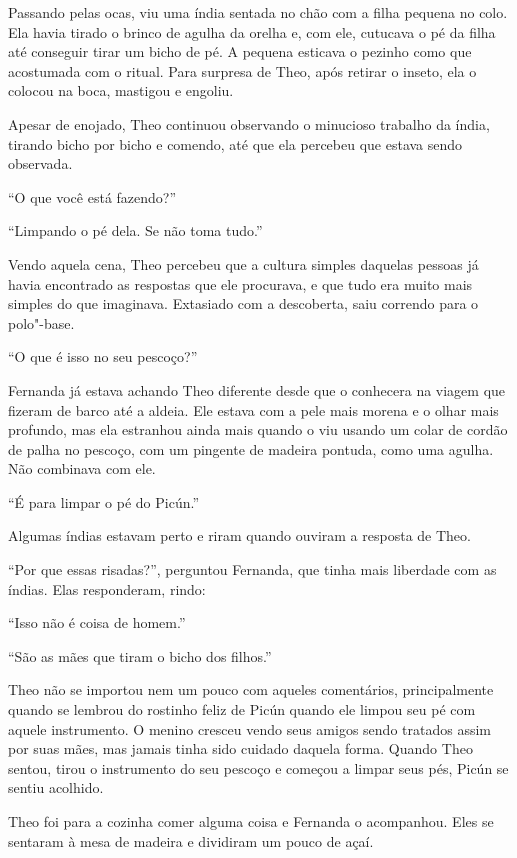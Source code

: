 Passando pelas ocas, viu uma índia sentada no chão com a filha pequena
no colo. Ela havia tirado o brinco de agulha da orelha e, com ele,
cutucava o pé da filha até conseguir tirar um bicho de pé. A pequena
esticava o pezinho como que acostumada com o ritual. Para surpresa de
Theo, após retirar o inseto, ela o colocou na boca, mastigou e engoliu.

Apesar de enojado, Theo continuou observando o minucioso trabalho da
índia, tirando bicho por bicho e comendo, até que ela percebeu que
estava sendo observada.

``O que você está fazendo?''

``Limpando o pé dela. Se não toma tudo.''

Vendo aquela cena, Theo percebeu
que a cultura simples daquelas pessoas já havia encontrado as respostas
que ele procurava, e que tudo era muito mais simples do que imaginava.
Extasiado com a descoberta, saiu correndo para o polo"-base.

\asterisc


``O que é isso no seu pescoço?''

Fernanda já estava achando Theo diferente desde que o conhecera na
viagem que fizeram de barco até a aldeia. Ele estava com a pele mais
morena e o olhar mais profundo, mas ela estranhou ainda mais quando o
viu usando um colar de cordão de palha no pescoço, com um pingente de
madeira pontuda, como uma agulha. Não combinava com ele.

``É para limpar o pé do Picún.''

Algumas índias estavam perto e riram quando ouviram a resposta de Theo.

``Por que essas risadas?'', perguntou Fernanda, que tinha mais liberdade
com as índias. Elas responderam, rindo:

``Isso não é coisa de homem.''

``São as mães que tiram o bicho dos filhos.''

Theo não se importou nem um pouco com
aqueles comentários, principalmente quando se lembrou do rostinho feliz
de Picún quando ele limpou seu pé com aquele instrumento. O menino
cresceu vendo seus amigos sendo tratados assim por suas mães, mas jamais
tinha sido cuidado daquela forma. Quando Theo sentou, tirou o
instrumento do seu pescoço e começou a limpar seus pés, Picún se sentiu
acolhido.

Theo foi para a cozinha comer alguma coisa e Fernanda o acompanhou. Eles
se sentaram à mesa de madeira e dividiram um pouco de açaí.

